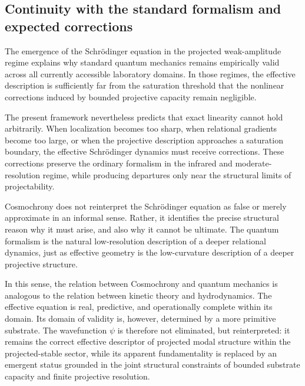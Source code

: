 \subsection{Continuity with the standard formalism and expected corrections}
  \label{subsec:continuity-with-standard-formalism}

  The emergence of the Schr\"{o}dinger equation in the projected weak-amplitude regime
  explains why standard quantum mechanics remains empirically valid across all currently
  accessible laboratory domains.
  In those regimes, the effective description is sufficiently far from the saturation threshold
  that the nonlinear corrections induced by bounded projective capacity remain negligible.

  The present framework nevertheless predicts that exact linearity cannot hold arbitrarily.
  When localization becomes too sharp, when relational gradients become too large, or when
  the projective description approaches a saturation boundary, the effective Schr\"{o}dinger
  dynamics must receive corrections.
  These corrections preserve the ordinary formalism in the infrared and moderate-resolution
  regime, while producing departures only near the structural limits of projectability.

  Cosmochrony does not reinterpret the Schr\"{o}dinger equation as false or merely
  approximate in an informal sense.
  Rather, it identifies the precise structural reason why it must arise, and also why it cannot
  be ultimate.
  The quantum formalism is the natural low-resolution description of a deeper relational
  dynamics, just as effective geometry is the low-curvature description of a deeper projective
  structure.

  In this sense, the relation between Cosmochrony and quantum mechanics is analogous to
  the relation between kinetic theory and hydrodynamics.
  The effective equation is real, predictive, and operationally complete within its domain.
  Its domain of validity is, however, determined by a more primitive substrate.
  The wavefunction $\psi$ is therefore not eliminated, but reinterpreted:
  it remains the correct effective descriptor of projected modal structure within the
  projected-stable sector, while its apparent fundamentality is replaced by an emergent
  status grounded in the joint structural constraints of bounded substrate capacity and
  finite projective resolution.
